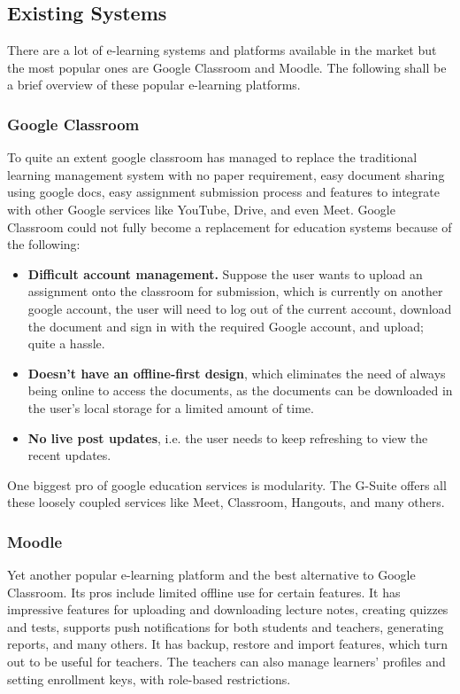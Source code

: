 \subsection{Existing Systems}

There are a lot of e-learning systems and platforms available in the market 
but the most popular ones are Google Classroom and Moodle. 
The following shall be a brief overview of these popular e-learning platforms.

\subsubsection{Google Classroom}
To quite an extent google classroom has managed to replace the traditional 
learning management system with no paper requirement, easy document sharing using google docs, 
easy assignment submission process and features to integrate with other Google services 
like YouTube, Drive, and even Meet. 
Google Classroom could not fully become a replacement for education systems because of the following:

\begin{itemize}
    \item \textbf{Difficult account management.} Suppose the user wants to upload an assignment onto the classroom for submission, 
    which is currently on another google account, the user will need to log out of the current account, 
    download the document and sign in with the required Google account, and upload; quite a hassle.
    \item \textbf{Doesn’t have an offline-first design}, which eliminates the need of always being online to access the documents, 
    as the documents can be downloaded in the user’s local storage for a limited amount of time.
    \item \textbf{No live post updates}, i.e. the user needs to keep refreshing to view the recent updates.
\end{itemize}

One biggest pro of google education services is modularity. The G-Suite offers all these 
loosely coupled services like Meet, Classroom, Hangouts, and many others.

\subsubsection{Moodle}
Yet another popular e-learning platform and the best alternative to Google Classroom. 
Its pros include limited offline use for certain features. It has impressive features for uploading and downloading lecture notes, creating quizzes and tests, supports push notifications for both students and teachers, generating reports, and many others. 
It has backup, restore and import features, which turn out to be useful for teachers. 
The teachers can also manage learners' profiles and setting enrollment keys, with role-based restrictions.

